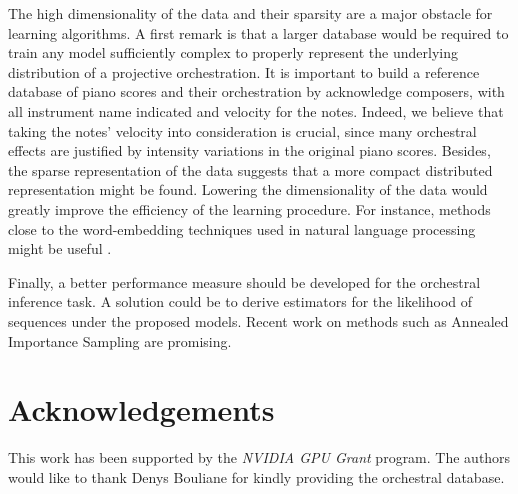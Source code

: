 \documentclass{article}
\begin{document}
The high dimensionality of the data and their sparsity are a major obstacle for learning algorithms.
A first remark is that a larger database would be required to train any model sufficiently complex to properly represent the underlying distribution of a projective orchestration.
It is important to build a reference database of piano scores and their orchestration by acknowledge composers, with all instrument name indicated and velocity for the notes. 
Indeed, we believe that taking the notes' velocity into consideration is crucial, since many orchestral effects are justified by intensity variations in the original piano scores. 
Besides, the sparse representation of the data suggests that a more compact distributed representation might be found. Lowering the dimensionality of the data would greatly improve the efficiency of the learning procedure. For instance, methods close to the word-embedding techniques used in natural language processing might be useful \cite{kiros2015skip}.

Finally, a better performance measure should be developed for the orchestral inference task. A solution could be to derive estimators for the likelihood of sequences under the proposed models. Recent work on methods such as Annealed Importance Sampling are promising.

\section{Acknowledgements}
This work has been supported by the \textit{NVIDIA GPU Grant} program.
The authors would like to thank Denys Bouliane for kindly providing the orchestral database.


\end{document}
